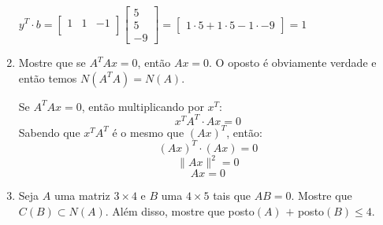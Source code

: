 \documentclass[leqno]{article}
\begin{document}
\begin{enumerate}
\begin{sol}
			$y^T \cdot b = \begin{bmatrix}
				1 & 1 & -1 \\
			\end{bmatrix}\begin{bmatrix}
				5 \\
				5 \\
				-9
			\end{bmatrix} = \begin{bmatrix}
			1 \cdot 5 + 1 \cdot 5 - 1 \cdot - 9 
		\end{bmatrix} = 1$
			
		\end{sol} 
		
		\item Mostre que se $A^TAx = 0$, então $Ax = 0$. O oposto é obviamente verdade e então temos $N(A^TA) = N(A)$.
		
		\begin{sol} 
			Se $A^TAx = 0$, então multiplicando por $x^T$: $$x^TA^T \cdot Ax = 0$$  
			Sabendo que $x^T A^T$ é o mesmo que $(Ax)^T$, então:
								$$ (Ax)^T \cdot (Ax) = 0$$
								$$ \|Ax\|^2 = 0$$
								$$ Ax = 0$$
		\end{sol} 
		
		\item Seja $A$ uma matriz $3 \times 4$ e $B$ uma $4 \times 5$ tais que $AB = 0$. Mostre que $C(B) \subset N(A)$. Além disso, mostre que posto$(A)$ $ + $ posto$(B) \leq 4$.
		

\end{enumerate}
\end{document}
